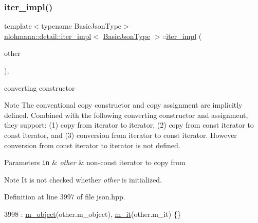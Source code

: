 \subsubsection{\texorpdfstring{iter\+\_\+impl()}{iter\_impl()}\hspace{0.1cm}{\footnotesize\ttfamily [3/3]}}
{\footnotesize\ttfamily template$<$typename Basic\+Json\+Type$>$ \\
\hyperlink{classnlohmann_1_1detail_1_1iter__impl}{nlohmann\+::detail\+::iter\+\_\+impl}$<$ \hyperlink{classnlohmann_1_1detail_1_1iter__impl_abf18f18793f84b0222aebb5a2a87da7a}{Basic\+Json\+Type} $>$\+::\hyperlink{classnlohmann_1_1detail_1_1iter__impl}{iter\+\_\+impl} (\begin{DoxyParamCaption}\item[{const \hyperlink{classnlohmann_1_1detail_1_1iter__impl}{iter\+\_\+impl}$<$ typename std\+::remove\+\_\+const$<$ \hyperlink{classnlohmann_1_1detail_1_1iter__impl_abf18f18793f84b0222aebb5a2a87da7a}{Basic\+Json\+Type} $>$\+::type $>$ \&}]{other }\end{DoxyParamCaption})\hspace{0.3cm}{\ttfamily [inline]}, {\ttfamily [noexcept]}}



converting constructor 

\begin{DoxyNote}{Note}
The conventional copy constructor and copy assignment are implicitly defined. Combined with the following converting constructor and assignment, they support\+: (1) copy from iterator to iterator, (2) copy from const iterator to const iterator, and (3) conversion from iterator to const iterator. However conversion from const iterator to iterator is not defined.
\end{DoxyNote}

\begin{DoxyParams}[1]{Parameters}
\mbox{\tt in}  & {\em other} & non-\/const iterator to copy from \\
\hline
\end{DoxyParams}
\begin{DoxyNote}{Note}
It is not checked whether {\itshape other} is initialized. 
\end{DoxyNote}


Definition at line 3997 of file json.\+hpp.


\begin{DoxyCode}
3998         : \hyperlink{classnlohmann_1_1detail_1_1iter__impl_aca84f84be598bdfaaddd23d928c42bbb}{m\_object}(other.m\_object), \hyperlink{classnlohmann_1_1detail_1_1iter__impl_a8a86a7c0d4af0cc4ab345b6f0e13cdfa}{m\_it}(other.m\_it) \{\}
\end{DoxyCode}


